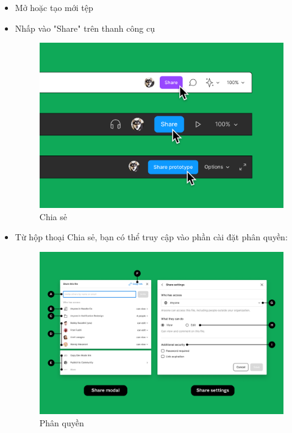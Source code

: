 \documentclass[11pt]{article}
\begin{document}
\begin{itemize}
    \item Mở hoặc tạo mới tệp
    \item Nhấp vào "Share" trên thanh công cụ

          \begin{figure}[!h]
              \centering
              \includegraphics[width=1\linewidth]{imgs/1.png}
              \caption{Chia sẻ}
          \end{figure}

          \newpage

    \item Từ hộp thoại Chia sẻ, bạn có thể truy cập vào phần cài đặt phân quyền:

          \begin{figure}[!h]
              \centering
              \includegraphics[width=1\linewidth]{imgs/2.png}
              \caption{Phân quyền}
          \end{figure}


\end{itemize}
\end{document}
